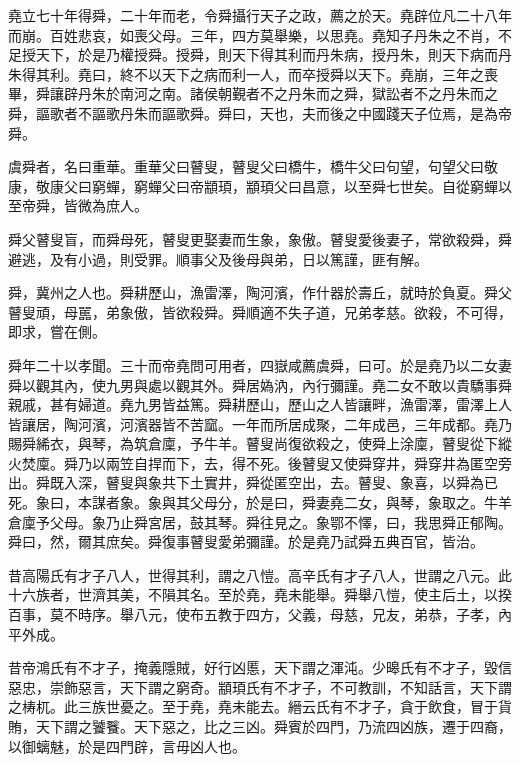 \documentclass[twocolumn]{cvertbook}
\begin{document}
堯立七十年得舜，二十年而老，令舜攝行天子之政，薦之於天。堯辟位凡二十八年而崩。百姓悲哀，如喪父母。三年，四方莫舉樂，以思堯。堯知子丹朱之不肖，不足授天下，於是乃權授舜。授舜，則天下得其利而丹朱病，授丹朱，則天下病而丹朱得其利。堯曰，終不以天下之病而利一人，而卒授舜以天下。堯崩，三年之喪畢，舜讓辟丹朱於南河之南。諸侯朝覲者不之丹朱而之舜，獄訟者不之丹朱而之舜，謳歌者不謳歌丹朱而謳歌舜。舜曰，天也，夫而後之中國踐天子位焉，是為帝舜。

虞舜者，名曰重華。重華父曰瞽叟，瞽叟父曰橋牛，橋牛父曰句望，句望父曰敬康，敬康父曰窮蟬，窮蟬父曰帝顓頊，顓頊父曰昌意，以至舜七世矣。自從窮蟬以至帝舜，皆微為庶人。

舜父瞽叟盲，而舜母死，瞽叟更娶妻而生象，象傲。瞽叟愛後妻子，常欲殺舜，舜避逃，及有小過，則受罪。順事父及後母與弟，日以篤謹，匪有解。

舜，冀州之人也。舜耕歷山，漁雷澤，陶河濱，作什器於壽丘，就時於負夏。舜父瞽叟頑，母嚚，弟象傲，皆欲殺舜。舜順適不失子道，兄弟孝慈。欲殺，不可得，即求，嘗在側。

舜年二十以孝聞。三十而帝堯問可用者，四嶽咸薦虞舜，曰可。於是堯乃以二女妻舜以觀其內，使九男與處以觀其外。舜居媯汭，內行彌謹。堯二女不敢以貴驕事舜親戚，甚有婦道。堯九男皆益篤。舜耕歷山，歷山之人皆讓畔，漁雷澤，雷澤上人皆讓居，陶河濱，河濱器皆不苦窳。一年而所居成聚，二年成邑，三年成都。堯乃賜舜絺衣，與琴，為筑倉廩，予牛羊。瞽叟尚復欲殺之，使舜上涂廩，瞽叟從下縱火焚廩。舜乃以兩笠自捍而下，去，得不死。後瞽叟又使舜穿井，舜穿井為匿空旁出。舜既入深，瞽叟與象共下土實井，舜從匿空出，去。瞽叟、象喜，以舜為已死。象曰，本謀者象。象與其父母分，於是曰，舜妻堯二女，與琴，象取之。牛羊倉廩予父母。象乃止舜宮居，鼓其琴。舜往見之。象鄂不懌，曰，我思舜正郁陶。舜曰，然，爾其庶矣。舜復事瞽叟愛弟彌謹。於是堯乃試舜五典百官，皆治。

昔高陽氏有才子八人，世得其利，謂之八愷。高辛氏有才子八人，世謂之八元。此十六族者，世濟其美，不隕其名。至於堯，堯未能舉。舜舉八愷，使主后土，以揆百事，莫不時序。舉八元，使布五教于四方，父義，母慈，兄友，弟恭，子孝，內平外成。

昔帝鴻氏有不才子，掩義隱賊，好行凶慝，天下謂之渾沌。少暤氏有不才子，毀信惡忠，崇飾惡言，天下謂之窮奇。顓頊氏有不才子，不可教訓，不知話言，天下謂之梼杌。此三族世憂之。至于堯，堯未能去。縉云氏有不才子，貪于飲食，冒于貨賄，天下謂之饕餮。天下惡之，比之三凶。舜賓於四門，乃流四凶族，遷于四裔，以御螭魅，於是四門辟，言毋凶人也。
\end{document}
